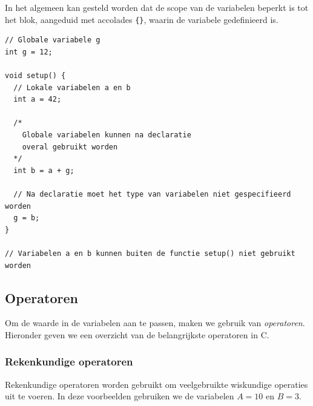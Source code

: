 \documentclass[11pt,fleqn]{book} %
\def\Cpp{{C\nolinebreak[4]\hspace{-.05em}\raisebox{.4ex}{\tiny\bf ++}}}
\begin{document}
\noindent
In het algemeen kan gesteld worden dat de scope van de variabelen beperkt is tot het blok, aangeduid met accolades \texttt{\{\}}, waarin de variabele gedefinieerd is.

\begin{example}
	\phantom{ }
	\begin{verbatim}
// Globale variabele g
int g = 12;

void setup() {
  // Lokale variabelen a en b
  int a = 42;
  
  /*
    Globale variabelen kunnen na declaratie 
    overal gebruikt worden
  */
  int b = a + g;
  
  // Na declaratie moet het type van variabelen niet gespecifieerd worden
  g = b;
}

// Variabelen a en b kunnen buiten de functie setup() niet gebruikt worden

	\end{verbatim}
\end{example}

\subsection{Operatoren}
Om de waarde in de variabelen aan te passen, maken we gebruik van \emph{operatoren}. Hieronder geven we een overzicht van de belangrijkste operatoren in \Cpp.

\subsubsection{Rekenkundige operatoren}

Rekenkundige operatoren worden gebruikt om veelgebruikte wiskundige operaties uit te voeren.
In deze voorbeelden gebruiken we de variabelen $ A = 10 $ en $ B = 3 $.
\end{document}

